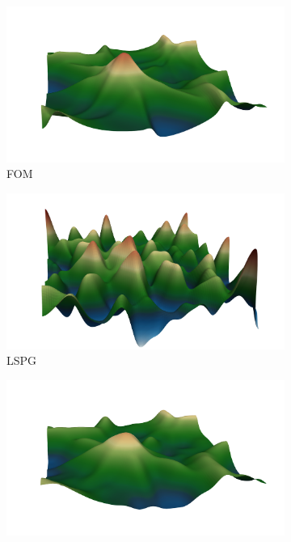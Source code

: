 \begin{figure}
\begin{center}
\begin{subfigure}[t]{0.49\textwidth}
\includegraphics[trim={4cm 0cm 2cm 2cm},clip,width=1.0\linewidth]{figs/swe/h_fom_t50.png}
\caption{FOM}
\end{subfigure}
\begin{subfigure}[t]{0.49\textwidth}
\includegraphics[trim={4cm 0cm 2cm 2cm},clip,width=1.0\linewidth]{figs/swe/h_lspg_t50.png}
\caption{LSPG}
\end{subfigure}
\begin{subfigure}[t]{0.49\textwidth}
\includegraphics[trim={4cm 0cm 2cm 2cm},clip,width=1.0\linewidth]{figs/swe/h_wls_DT05_t50.png}

\end{subfigure}
\end{center}
\end{figure}
